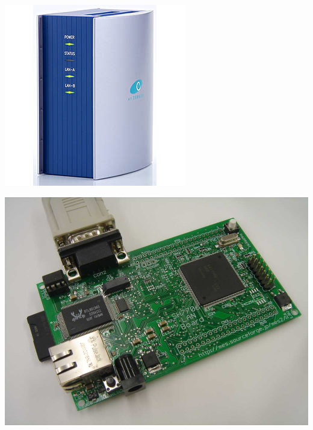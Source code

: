 \documentclass[cjk,dvipdfmx,12pt]{beamer}
\begin{document}
\begin{frame}
\begin{minipage}[t]{0.3\hsize}
  \includegraphics[width=1.0\hsize]{image200705/lbox.jpg}
 \end{minipage} 
 \begin{minipage}[t]{0.3\hsize}
  \includegraphics[width=1.0\hsize]{image200705/t-sh7706lan.jpg}
 \end{minipage} 
 \begin{minipage}[t]{0.4\hsize}

\end{minipage}
\end{frame}
\end{document}
